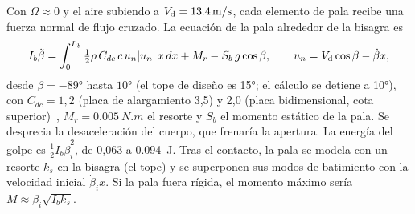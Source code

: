 Con $\Omega\approx0$ y el aire subiendo a $V_{\mathrm{d}}=\SI{13.4}{m/s}$, cada elemento de pala
recibe una fuerza normal de flujo cruzado. La ecuación de la pala alrededor de la
bisagra es
\begin{equation}
  I_b\ddot\beta=\int_0^{L_b}\tfrac12\rho\,C_{dc}\,c\,u_n|u_n|\,x\,dx+M_r-S_b\,g\cos\beta,
  \qquad u_n=V_{\mathrm{d}}\cos\beta-\dot\beta x ,
  \label{eq:estructura-apertura}
\end{equation}
desde $\beta=\ang{-89}$ hasta $\ang{+10}$ (el tope de diseño es \ang{+15}; el cálculo se
detiene a \ang{+10}), con $C_{dc}=1{,}2$ (placa de alargamiento 3,5)
y 2,0 (placa bidimensional, cota superior)~\cite{hoerner1965}, $M_r=\SI{0.005}{N.m}$ el
resorte y $S_b$ el momento estático de la pala. Se desprecia la desaceleración del cuerpo,
que frenaría la apertura. La energía del golpe es
$\frac12I_b\dot\beta_i^2$, de 0,063 a \SI{0.094}{J}. Tras el contacto, la pala se modela
con un resorte $k_s$ en la bisagra (el tope) y se superponen sus modos de batimiento con
la velocidad inicial $\dot\beta_i x$. Si la pala fuera rígida, el momento máximo sería
$M\approx\dot\beta_i\sqrt{I_b k_s}$.

